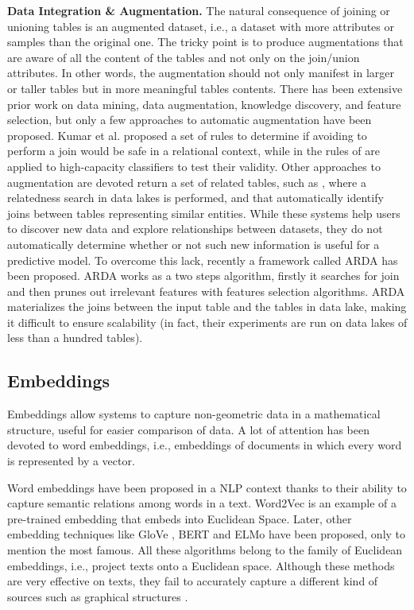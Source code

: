 \textbf{Data Integration \& Augmentation.} The natural consequence of joining or unioning tables is an augmented dataset, i.e., a dataset with more attributes or samples than the original one. The tricky point is to produce augmentations that are aware of all the content of the tables and not only on the join/union attributes. In other words, the augmentation should not only manifest in larger or taller tables but in more meaningful tables contents. There has been extensive prior work on data mining, data augmentation, knowledge discovery, and feature selection, but only a few approaches to automatic augmentation have been proposed. Kumar et al. \cite{kumar2016join} proposed a set of rules to determine if avoiding to perform a join would be safe in a relational context, while in \cite{shah2017key} the rules of \cite{kumar2016join} are applied to high-capacity classifiers to test their validity. Other approaches to augmentation are devoted return a set of related tables, such as \cite{bogatu2020dataset}, where a relatedness search in data lakes is performed, and \cite{fernandez2018aurum} that automatically identify joins between tables representing similar entities. While these systems help users to discover new data and explore relationships between datasets, they do not automatically determine whether or not such new information
is useful for a predictive model. To overcome this lack, recently a framework called ARDA \cite{chepurko2020arda} has been proposed. ARDA works as a two steps algorithm, firstly it searches for join and then prunes out irrelevant features with features selection algorithms. ARDA materializes the joins between the input table and the tables in data lake, making it difficult to ensure scalability (in fact, their experiments are run on data lakes of less than a hundred tables).

\subsection{Embeddings}
Embeddings allow systems to capture non-geometric data in a mathematical structure, useful for easier comparison of data. A lot of attention has been devoted to word embeddings, i.e., embeddings of documents in which every word is represented by a vector. 

Word embeddings have been proposed in a NLP context thanks to their ability to capture semantic relations among words in a text. 
Word2Vec \cite{Mikolov2013EfficientEO} is an example of a pre-trained embedding that embeds into Euclidean Space. 
Later, other embedding techniques like GloVe \cite{pennington2014glove}, BERT \cite{devlin2018bert} and ELMo \cite{peters2018deep} have been proposed, only to mention the most famous. 
All these algorithms belong to the family of Euclidean embeddings, i.e., project texts onto a Euclidean space. 
Although these methods are very effective on texts, they fail to accurately capture a different kind of sources such as graphical structures \cite{NIPS2017_7213}. 

